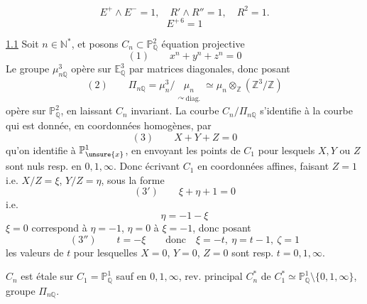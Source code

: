 \[
E^+\wedge E^-=1,\quad R'\wedge R''=1,\quad R^2=1.
\]
\[E^{+\,6}=1\]

\uline{1.1} Soit $n\in\mathbb N^*$, et posons
$C_n\subset\mathbb P^2_{\mathbb Q}$ équation projective
\[
(1)\qquad x^n+y^n+z^n=0
\]
Le groupe $\mu_{n\mathbb Q}^3$ opère sur $\mathbb E^3_{\mathbb Q}$ par matrices diagonales,
donc posant
\[
(2)\qquad \Pi_{n\mathbb Q}=\mu_n^3/\underset{\substack{\curvearrowright\,\text{diag.}}}{\mu_n}
\simeq\mu_n\otimes_{\mathbb Z}(\mathbb Z^3/\mathbb Z)
\]
opère sur $\mathbb P^2_{\mathbb Q}$, en laissant $C_n$ invariant. La courbe
$C_n/\Pi_{n\mathbb Q}$ s'identifie à la courbe  qui est donnée,
en coordonnées homogènes, par
\[
(3)\qquad X+Y+Z=0
\]
qu'on identifie à $\mathbb P^1_{\unsure{x}}$, en envoyant les points de $C_1$
pour lesquels $X,Y$ ou $Z$ sont nuls resp. en $0,1,\infty$.
Donc écrivant $C_1$ en coordonnées affines, faisant $Z=1$
i.e. $X/Z=\xi$, $Y/Z=\eta$, sous la forme
\[
(3')\qquad \xi+\eta+1=0
\]
i.e.
\[
\eta=-1-\xi
\]
$\xi=0$ correspond à $\eta=-1$, $\eta=0$ à $\xi=-1$, donc posant
\[
(3'')\qquad t=-\xi\qquad\text{donc}\quad \xi=-t,\ \eta=t-1,\ \zeta=1
\]
les valeurs de $t$ pour lesquelles $X=0$, $Y=0$, $Z=0$ sont resp. $t=0,1,\infty$.

$C_n$ est étale sur $C_1=\mathbb P^1_{\mathbb Q}$ sauf en $0,1,\infty$, 
 rev. principal $C_n^*$ de $C_1^*\simeq\mathbb P^1_{\mathbb Q}\setminus\{0,1,\infty\}$,
groupe $\Pi_{n\mathbb Q}$.


